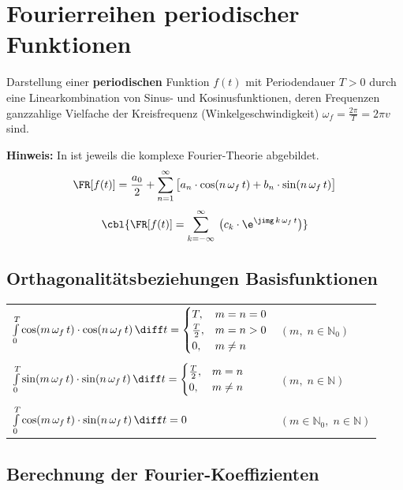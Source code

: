\section{Fourierreihen periodischer Funktionen}

Darstellung einer \textbf{periodischen} Funktion $f(t)$ mit Periodendauer $T > 0$ durch eine Linearkombination von Sinus- und Kosinusfunktionen,
deren Frequenzen ganzzahlige Vielfache der Kreisfrequenz (Winkelgeschwindigkeit) $\omega_f = \frac{2 \pi}{T} = 2 \pi v$ sind. 

\smallskip

\textbf{Hinweis:} In  ist jeweils die komplexe Fourier-Theorie abgebildet.
$$ \FR[f(t)] = \frac{a_0}{2} + \sum\limits _{n=1}^\infty \big[ a_n \cdot \cos(n \, \omega_f \, t) + b_n \cdot \sin(n \, \omega_f \, t) \big] $$
$$ \cbl{\FR[f(t)] = \sum\limits _{k = -\infty}^\infty \: \big( c_k \cdot \e^{\jimg \, k \, \omega_f \, t} \big)} $$


\subsection{Orthagonalitätsbeziehungen Basisfunktionen}

\begin{tabular}{ll}
    $\int \limits_{0}^{T} \cos(m \, \omega_f \, t) \cdot \cos(n \, \omega_f \, t) \, \diff t = 
    \begin{cases}
        T,              & m = n = 0 \\
        \frac{T}{2},    & m = n > 0 \\
        0,              & m \neq n
    \end{cases}$ 
    & $(m, \; n \in \mathbb{N}_0)$ \\
    \\
    $\int \limits_{0}^{T} \sin(m \, \omega_f \, t) \cdot \sin(n \, \omega_f \, t) \, \diff t =      		
    \begin{cases}
        \frac{T}{2},    & m = n     \\
        0,              & m \neq n
    \end{cases} $ 
    & $(m, \; n \in \mathbb{N})$    \\
    \\
    $\int \limits_{0}^{T} \cos(m \, \omega_f \, t) \cdot \sin(n \, \omega_f \, t) \, \diff t = 0$ 	
    & $(m \in \mathbb{N}_0, \; n \in \mathbb{N})$ 
\end{tabular}


\subsection{Berechnung der Fourier-Koeffizienten}

